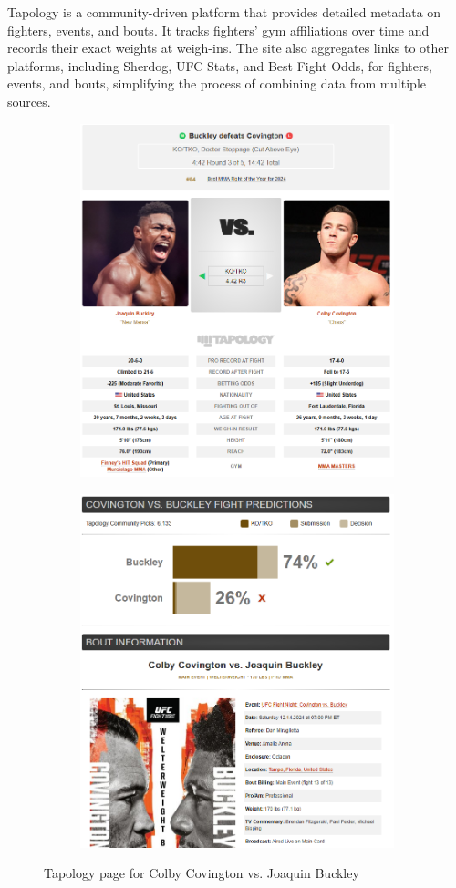\documentclass[12pt,twoside]{report}
\begin{document}
Tapology is a community-driven platform that provides detailed metadata on fighters, events, and bouts. It tracks fighters' gym affiliations over time and records their exact weights at weigh-ins. The site also aggregates links to other platforms, including Sherdog, UFC Stats, and Best Fight Odds, for fighters, events, and bouts, simplifying the process of combining data from multiple sources.

\begin{figure}[htb]
\centering
\captionsetup{justification=centering}
\begin{subfigure}{.5\linewidth}
  \centering
  \includegraphics[width=0.7\linewidth]{figures/tapology1.png}
\end{subfigure}%
\begin{subfigure}{.5\linewidth}
  \centering
  \includegraphics[width=0.7\linewidth]{figures/tapology2.png}
\end{subfigure}
\caption{Tapology page for Colby Covington vs. Joaquin Buckley}
\end{figure}
\end{document}
